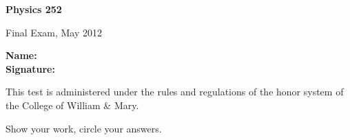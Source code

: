 \documentclass[letterpaper,addpoints,answers]{exam}
\begin{document}

\begin{coverpages}
	\noindent 
  \large\bfseries Physics 252

  \vspace{2ex}
	\noindent 
  Final Exam, May  2012

  \vspace{5ex}
	\noindent 
  \large\bfseries Name:\enspace\makebox[2in]{\hrulefill}\\

  \vspace{5ex}
	\noindent 
  \large\bfseries Signature:\enspace\makebox[2in]{\hrulefill}

  \vspace{5ex}
	\noindent 
	This test is administered under the rules and regulations of the honor 
	system of the College of William \& Mary.  

  \vspace{5ex}
	\noindent 
	Show your work, circle your answers.


  \vspace{5ex}
  \combinedgradetable[v][questions]
\end{coverpages}
 
\begin{questions}

	
	
	
	
	
	
	
	
	
	


\end{questions}
\end{document}
